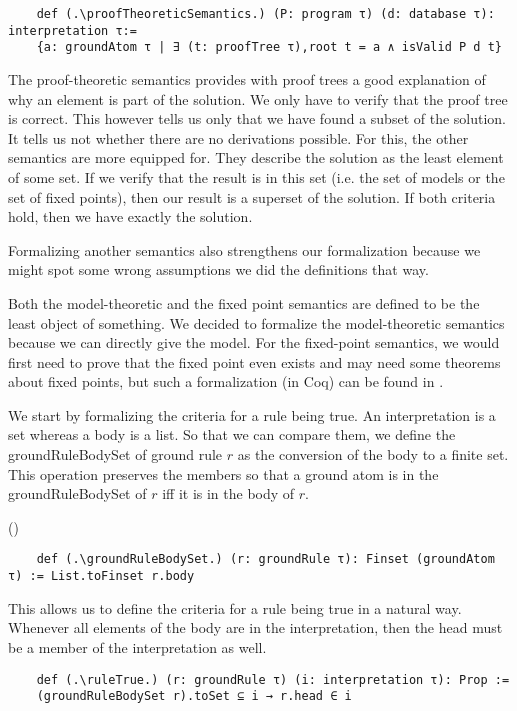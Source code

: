 \begin{lstlisting}
    def (.\proofTheoreticSemantics.) (P: program τ) (d: database τ): interpretation τ:= 
    {a: groundAtom τ | ∃ (t: proofTree τ),root t = a ∧ isValid P d t}
\end{lstlisting}

The proof-theoretic semantics provides with proof trees a good explanation of why an element is part of the solution. We only have to verify that the proof tree is correct. This however tells us only that we have found a subset of the solution. It tells us not whether there are no derivations possible. For this, the other semantics are more equipped for. They describe the solution as the least element of some set. If we verify that the result is in this set (i.e. the set of models or the set of fixed points), then our result is a superset of the solution. If both criteria hold, then we have exactly the solution.

Formalizing another semantics also strengthens our formalization because we might spot some wrong assumptions we did the definitions that way.

Both the model-theoretic and the fixed point semantics are defined to be the least object of something. We decided to formalize the model-theoretic semantics because we can directly give the model. For the fixed-point semantics, we would first need to prove that the fixed point even exists and may need some theorems about fixed points, but such a formalization (in Coq) can be found in \cite{datalogCoq}.

We start by formalizing the criteria for a rule being true. An interpretation is a set whereas a body is a list. So that we can compare them, we define the groundRuleBodySet of ground rule $r$ as the conversion of the body to a finite set. This operation preserves the members so that a ground atom is in the groundRuleBodySet of $r$ iff it is in the body of $r$.


(\groundRuleBodySetiffgroundRuleBody)


\begin{lstlisting}
    def (.\groundRuleBodySet.) (r: groundRule τ): Finset (groundAtom τ) := List.toFinset r.body
\end{lstlisting}

This allows us to define the criteria for a rule being true in a natural way. Whenever all elements of the body are in the interpretation, then the head must be a member of the interpretation as well.

\begin{lstlisting}
    def (.\ruleTrue.) (r: groundRule τ) (i: interpretation τ): Prop := 
    (groundRuleBodySet r).toSet ⊆ i → r.head ∈ i
\end{lstlisting}

